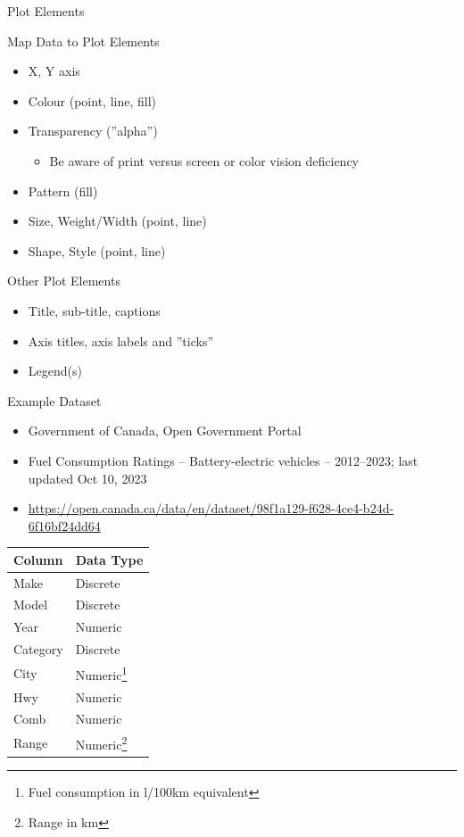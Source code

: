 \documentclass[ignorenonframetext,xcolor=x11names]{beamer}
\begin{document}
\begin{frame}{Plot Elements}
	\begin{block}{Map Data to Plot Elements}
	\begin{itemize}
		\item X, Y axis
		\item Colour (point, line, fill)
		\item Transparency (''alpha'')
		\begin{itemize}
		   \item \alert{Be aware of print versus screen or color vision deficiency}
		\end{itemize}
		\item Pattern (fill)
		\item Size, Weight/Width (point, line)
		\item Shape, Style (point, line)
	\end{itemize}
	\end{block}
	\begin{block}{Other Plot Elements}
		\begin{itemize}
			\item Title, sub-title, captions
			\item Axis titles, axis labels and ''ticks''
			\item Legend(s)
		\end{itemize}
	\end{block}
\end{frame}

\begin{frame}{Example Dataset}
\begin{itemize}
  \item Government of Canada, Open Government Portal
  \item Fuel Consumption Ratings -- Battery-electric vehicles -- 2012--2023; last updated Oct 10, 2023
  \item \href{https://open.canada.ca/data/en/dataset/98f1a129-f628-4ce4-b24d-6f16bf24dd64}{https://open.canada.ca/data/en/dataset/98f1a129-f628-4ce4-b24d-6f16bf24dd64}
\end{itemize}
\centering
\footnotesize

	\begin{tabular}{|l|l|} \hline
	  {\bf Column} & {\bf Data Type} \\ \hline \hline
	  Make & Discrete \\ 
	  Model & Discrete \\
	  Year & Numeric \\
	  Category & Discrete \\
	  City & Numeric\footnote{Fuel consumption in l/100km equivalent} \\
	  Hwy & Numeric \\
	  Comb & Numeric \\
	  Range & Numeric\footnote{Range in km} \\ \hline
	\end{tabular}
\end{frame}
\end{document}
